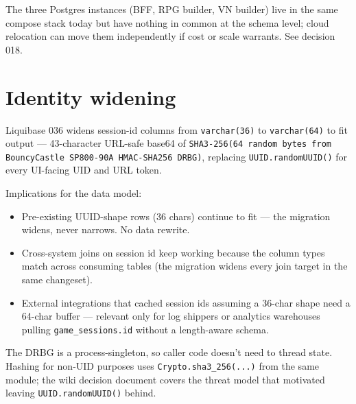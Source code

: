 \documentclass[11pt,a4paper,openany]{book}
\begin{document}
The three Postgres instances (BFF, RPG builder, VN builder) live in
the same compose stack today but have nothing in common at the
schema level; cloud relocation can move them independently if cost
or scale warrants. See decision 018.

\chapter{Identity widening}
Liquibase 036 widens session-id columns from \texttt{varchar(36)} to
\texttt{varchar(64)} to fit  output ---
43-character URL-safe base64 of \texttt{SHA3-256(64 random bytes
from BouncyCastle SP800-90A HMAC-SHA256 DRBG)}, replacing
\texttt{UUID.randomUUID()} for every UI-facing UID and URL token.

Implications for the data model:

\begin{itemize}
  \item Pre-existing UUID-shape rows (36 chars) continue to fit ---
        the migration widens, never narrows. No data rewrite.
  \item Cross-system joins on session id keep working because the
        column types match across consuming tables (the migration
        widens every join target in the same changeset).
  \item External integrations that cached session ids assuming a
        36-char shape need a 64-char buffer --- relevant only for
        log shippers or analytics warehouses pulling \texttt{game\_sessions.id}
        without a length-aware schema.
\end{itemize}

The DRBG is a process-singleton, so caller code doesn't need to
thread state. Hashing for non-UID purposes uses
\texttt{Crypto.sha3\_256(...)} from the same module; the wiki
decision document covers the threat model that motivated leaving
\texttt{UUID.randomUUID()} behind.
\end{document}
